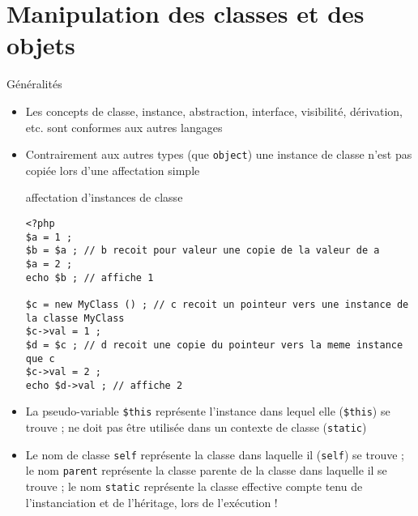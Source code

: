 
\section{Manipulation des classes et des objets}

\begin{frame}[containsverbatim]{Généralités}
	\begin{itemize}
		\item Les concepts de classe, instance, abstraction, interface, visibilité, dérivation, etc. sont conformes aux autres langages
		\item Contrairement aux autres types (que \texttt{object}) une instance de classe n’est pas copiée lors d’une affectation simple
		\begin{block}{affectation d’instances de classe}
			\begin{lstlisting}
<?php
$a = 1 ;
$b = $a ; // b recoit pour valeur une copie de la valeur de a
$a = 2 ;
echo $b ; // affiche 1

$c = new MyClass () ; // c recoit un pointeur vers une instance de la classe MyClass
$c->val = 1 ;
$d = $c ; // d recoit une copie du pointeur vers la meme instance que c
$c->val = 2 ;
echo $d->val ; // affiche 2
			\end{lstlisting}
		\end{block}
		\item La pseudo-variable \texttt{\$this} représente l’instance dans lequel elle (\texttt{\$this}) se trouve ; ne doit pas être utilisée dans un contexte de classe (\texttt{static})
		\item Le nom de classe \texttt{self} représente la classe dans laquelle il (\texttt{self}) se trouve ; le nom \texttt{parent} représente la classe parente de la classe dans laquelle il se trouve ; le nom \texttt{static} représente la classe effective compte tenu de l’instanciation et de l’héritage, lors de l’exécution !
	\end{itemize}
\end{frame}

